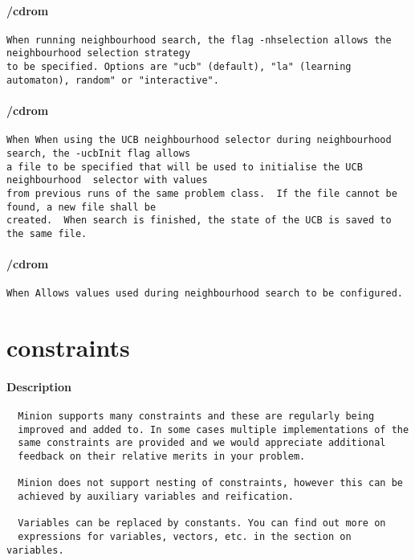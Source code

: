 \paragraph{/cdrom}
{\footnotesize
\begin{verbatim}
When running neighbourhood search, the flag -nhselection allows the neighbourhood selection strategy
to be specified. Options are "ucb" (default), "la" (learning automaton), random" or "interactive".
\end{verbatim}
}
\paragraph{/cdrom}
{\footnotesize
\begin{verbatim}
When When using the UCB neighbourhood selector during neighbourhood search, the -ucbInit flag allows
a file to be specified that will be used to initialise the UCB neighbourhood  selector with values
from previous runs of the same problem class.  If the file cannot be found, a new file shall be
created.  When search is finished, the state of the UCB is saved to the same file.
\end{verbatim}
}
\paragraph{/cdrom}
{\footnotesize
\begin{verbatim}
When Allows values used during neighbourhood search to be configured.
\end{verbatim}
}
\section{constraints}
\paragraph{Description}
{\footnotesize
\begin{verbatim}
  Minion supports many constraints and these are regularly being
  improved and added to. In some cases multiple implementations of the
  same constraints are provided and we would appreciate additional
  feedback on their relative merits in your problem.

  Minion does not support nesting of constraints, however this can be
  achieved by auxiliary variables and reification.

  Variables can be replaced by constants. You can find out more on
  expressions for variables, vectors, etc. in the section on variables.
\end{verbatim}
}
